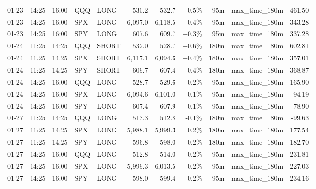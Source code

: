 \documentclass[11pt,a4paper,twoside]{article}
\begin{document}
\begin{center}
\begin{longtable}{>{\color{txtmain}}l l l l l r r r r >{\color{txtmain}}l r}
01-23 & 14:25 & 16:00 & QQQ & LONG & 530.2 & 532.7 & \textcolor{wingreen}{+0.5\%} & 95m & max\_time\_180m & \textcolor{wingreen}{461.50} \\
01-23 & 14:25 & 16:00 & SPX & LONG & 6,097.0 & 6,118.5 & \textcolor{wingreen}{+0.4\%} & 95m & max\_time\_180m & \textcolor{wingreen}{343.28} \\
01-23 & 14:25 & 16:00 & SPY & LONG & 607.6 & 609.7 & \textcolor{wingreen}{+0.3\%} & 95m & max\_time\_180m & \textcolor{wingreen}{337.28} \\
01-24 & 11:25 & 14:25 & QQQ & SHORT & 532.0 & 528.7 & \textcolor{wingreen}{+0.6\%} & 180m & max\_time\_180m & \textcolor{wingreen}{602.81} \\
01-24 & 11:25 & 14:25 & SPX & SHORT & 6,117.1 & 6,094.6 & \textcolor{wingreen}{+0.4\%} & 180m & max\_time\_180m & \textcolor{wingreen}{357.01} \\
01-24 & 11:25 & 14:25 & SPY & SHORT & 609.7 & 607.4 & \textcolor{wingreen}{+0.4\%} & 180m & max\_time\_180m & \textcolor{wingreen}{368.87} \\
01-24 & 14:25 & 16:00 & QQQ & LONG & 528.7 & 529.6 & \textcolor{wingreen}{+0.2\%} & 95m & max\_time\_180m & \textcolor{wingreen}{165.90} \\
01-24 & 14:25 & 16:00 & SPX & LONG & 6,094.6 & 6,101.0 & \textcolor{wingreen}{+0.1\%} & 95m & max\_time\_180m & \textcolor{wingreen}{94.19} \\
01-24 & 14:25 & 16:00 & SPY & LONG & 607.4 & 607.9 & \textcolor{wingreen}{+0.1\%} & 95m & max\_time\_180m & \textcolor{wingreen}{78.90} \\
01-27 & 11:25 & 14:25 & QQQ & LONG & 513.3 & 512.8 & \textcolor{lossred}{-0.1\%} & 180m & max\_time\_180m & \textcolor{lossred}{-99.63} \\
01-27 & 11:25 & 14:25 & SPX & LONG & 5,988.1 & 5,999.3 & \textcolor{wingreen}{+0.2\%} & 180m & max\_time\_180m & \textcolor{wingreen}{177.54} \\
01-27 & 11:25 & 14:25 & SPY & LONG & 596.8 & 598.0 & \textcolor{wingreen}{+0.2\%} & 180m & max\_time\_180m & \textcolor{wingreen}{182.70} \\
01-27 & 14:25 & 16:00 & QQQ & LONG & 512.8 & 514.0 & \textcolor{wingreen}{+0.2\%} & 95m & max\_time\_180m & \textcolor{wingreen}{231.81} \\
01-27 & 14:25 & 16:00 & SPX & LONG & 5,999.3 & 6,013.5 & \textcolor{wingreen}{+0.2\%} & 95m & max\_time\_180m & \textcolor{wingreen}{227.03} \\
01-27 & 14:25 & 16:00 & SPY & LONG & 598.0 & 599.4 & \textcolor{wingreen}{+0.2\%} & 95m & max\_time\_180m & \textcolor{wingreen}{234.16} \\

\end{longtable}
\end{center}
\end{document}
